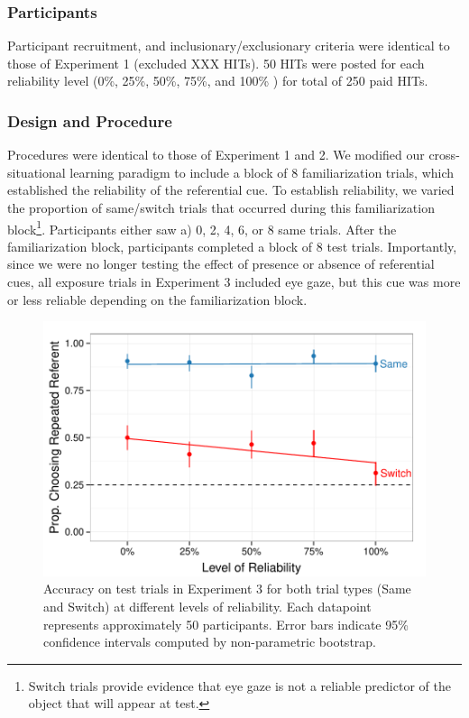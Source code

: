\documentclass[10pt,letterpaper]{article}
\begin{document}
\subsubsection{Participants}
Participant recruitment, and inclusionary/exclusionary criteria were identical to those of Experiment 1 (excluded XXX HITs). 50 HITs were posted for each reliability level (0\%, 25\%, 50\%, 75\%, and 100\% ) for total of 250 paid HITs.  

\subsubsection{Design and Procedure}

Procedures were identical to those of Experiment 1 and 2. We modified our cross-situational learning paradigm to include a block of 8 familiarization trials, which established the reliability of the referential cue. To establish reliability, we varied the proportion of same/switch trials that occurred during this familiarization block\footnote{Switch trials provide evidence that eye gaze is not a reliable predictor of the object that will appear at test.}. Participants either saw a) 0, 2, 4, 6, or 8 same trials. After the familiarization block, participants completed a block of 8 test trials. Importantly, since we were no longer testing the effect of presence or absence of referential cues, all exposure trials in Experiment 3 included eye gaze, but this cue was more or less reliable depending on the familiarization block.

\begin{figure}[t!]
\begin{center}
\includegraphics[scale=0.35]{plots_figs/acc-test-expt3}
\end{center}
\caption{Accuracy on test trials in Experiment 3 for both trial types (Same and Switch) at different levels of reliability. Each datapoint represents 
approximately 50 participants. Error bars indicate 95\% confidence intervals 
computed by non-parametric bootstrap.}
\end{figure}
\end{document}

